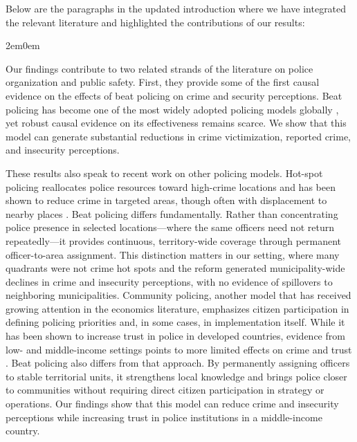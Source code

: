 Below are the paragraphs in the updated introduction where we have integrated the relevant literature and highlighted the contributions of our results: 

\begin{adjustwidth}{2em}{0em}

Our findings contribute to two related strands of the literature on police organization and public safety. First, they provide some of the first causal evidence on the effects of beat policing on crime and security perceptions. Beat policing has become one of the most widely adopted policing models globally \citep{NASEM2018,PCSP2014}, yet robust causal evidence on its effectiveness remains scarce. We show that this model can generate substantial reductions in crime victimization, reported crime, and insecurity perceptions.

These results also speak to recent work on other policing models. Hot-spot policing reallocates police resources toward high-crime locations and has been shown to reduce crime in targeted areas, though often with displacement to nearby places \citep{DiTella, Blattman_Tobon_JEEA, Draca_2011, Weisburd_restat}. Beat policing differs fundamentally. Rather than concentrating police presence in selected locations---where the same officers need not return repeatedly---it provides continuous, territory-wide coverage through permanent officer-to-area assignment. This distinction matters in our setting, where many quadrants were not crime hot spots and the reform generated municipality-wide declines in crime and insecurity perceptions, with no evidence of spillovers to neighboring municipalities. Community policing, another model that has received growing attention in the economics literature, emphasizes citizen participation in defining policing priorities and, in some cases, in implementation itself. While it has been shown to increase trust in police in developed countries, evidence from low- and middle-income settings points to more limited effects on crime and trust \citep{blair2021, Tobon}. Beat policing also differs from that approach. By permanently assigning officers to stable territorial units, it strengthens local knowledge and brings police closer to communities without requiring direct citizen participation in strategy or operations. Our findings show that this model can reduce crime and insecurity perceptions while increasing trust in police institutions in a middle-income country.


\end{adjustwidth}
